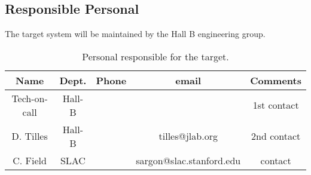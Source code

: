 \subsection{Responsible Personal}

\indent

The target system will be maintained by the Hall B engineering group.  

 \begin{table}[!htb]
 \centering
 \begin{tabular}{|c|c|c|c|c|}
\hline
 Name&Dept.&Phone&email&Comments \\ \hline
 Tech-on-call & Hall-B&&& 1st contact  \\ \hline
 D. Tilles & Hall-B&&tilles@jlab.org&2nd contact \\ \hline
C. Field& SLAC&&sargon@slac.stanford.edu&contact \\ \hline
 \end{tabular}
\caption{ Personal responsible for the target.} 
\label{tb:beam}
\end{table}

